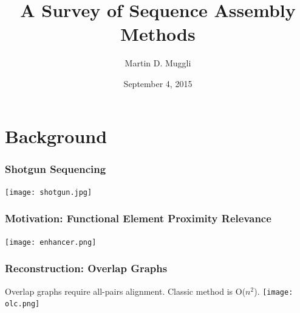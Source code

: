 \documentclass{beamer}
\title{A Survey of Sequence Assembly Methods}
\author{Martin D. Muggli}
\date{September 4, 2015}
\begin{document}
\maketitle


\section{Background}
\begin{frame}
\frametitle{Shotgun Sequencing}

\texttt{[image: shotgun.jpg]}


\end{frame}


\begin{frame}
\frametitle{Motivation: Functional Element Proximity Relevance}

\texttt{[image: enhancer.png]}


\end{frame}





\begin{frame}
\frametitle{Reconstruction: Overlap Graphs}
Overlap graphs require all-pairs alignment.  Classic method is O($n^2$).
\texttt{[image: olc.png]}


\end{frame}
\end{document}
